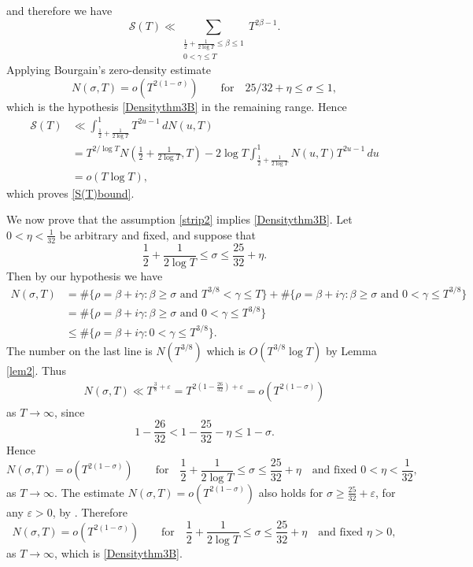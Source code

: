 \documentclass{amsart}
\newcommand{\1}{\mathbbm{1}}
\theoremstyle{remark}
\numberwithin{equation}{section}
\begin{document}
and therefore we have 
\[ \mathcal{S}(T) \ll \sum_{\substack{\frac12 + \frac1{2\log T} \le \beta \le 1 \\ 0<\gamma \le T}} T^{2\beta-1}. \]
Applying Bourgain's zero-density estimate \cite{Bou00}
\begin{equation}\label{Bourgain-density}
N(\sigma,T) = o(T^{2(1-\sigma)}) \qquad\text{for}\quad 25/32+\eta\le\sigma\le1,
\end{equation} which is the hypothesis \eqref{Densitythm3B} in the remaining range. Hence
\[ \begin{split} \mathcal{S}(T) &\ll \int_{\frac12 + \frac1{2\log T}}^1 T^{2u-1}\, dN(u,T) \\&
= T^{2/\log T} N\left(\frac12 + \frac1{2\log T},T\right) - 2\log T\int_{\frac12 + \frac1{2\log T}}^1 N(u,T) T^{2u-1}\, du \\& =o(T\log T),
\end{split} \]
which proves \eqref{S(T)bound}.

We now prove that the assumption \eqref{strip2} implies \eqref{Densitythm3B}. Let $0<\eta<\frac{1}{32}$ be arbitrary and fixed, and suppose that
$$ \frac{1}{2}+\frac{1}{2\log T} \leq \sigma \leq \frac{25}{32}+\eta. $$
Then by our hypothesis we have
\begin{align*}
N(\sigma,T)
&= \#\{\rho =\beta+i\gamma : \beta\geq \sigma \text{ and } T^{3/8}<\gamma\leq T\} + \#\{\rho =\beta+i\gamma : \beta\geq \sigma \text{ and } 0<\gamma\leq T^{3/8}\} \\
&= \#\{\rho =\beta+i\gamma : \beta\geq \sigma \text{ and } 0<\gamma\leq T^{3/8}\} \\
&\leq \#\{\rho =\beta+i\gamma : 0<\gamma\leq T^{3/8}\}.
\end{align*}
The number on the last line is $N(T^{3/8})$ which is $O(T^{3/8}\log T)$ by Lemma \ref{lem2}.
Thus
\begin{align*}
N(\sigma,T) \ll T^{\frac{3}{8}+\varepsilon} 
= T^{2(1-\frac{26}{32})+\varepsilon} 
= o(T^{2(1-\sigma)})
\end{align*}
as $T\rightarrow \infty$, since
$$ 1-\frac{26}{32} < 1-\frac{25}{32}-\eta \leq 1-\sigma. $$
Hence
$$ N(\sigma,T)=o(T^{2(1-\sigma)}) \qquad\text{for}\quad \frac{1}{2}+\frac{1}{2\log T} \leq \sigma \leq \frac{25}{32}+\eta \quad\text{and fixed } 0<\eta<\frac{1}{32}, $$
as $T\rightarrow \infty$.
The estimate $N(\sigma,T)=o(T^{2(1-\sigma)})$ also holds for $\sigma\geq \frac{25}{32}+\varepsilon$, for any $\varepsilon>0$, by \cite[p. 146]{Bou00}. Therefore
$$ N(\sigma,T)=o(T^{2(1-\sigma)}) \qquad\text{for}\quad \frac{1}{2}+\frac{1}{2\log T} \leq \sigma \leq \frac{25}{32}+\eta \quad\text{and fixed } \eta>0, $$
as $T\rightarrow \infty$, which is \eqref{Densitythm3B}.
\end{document}
